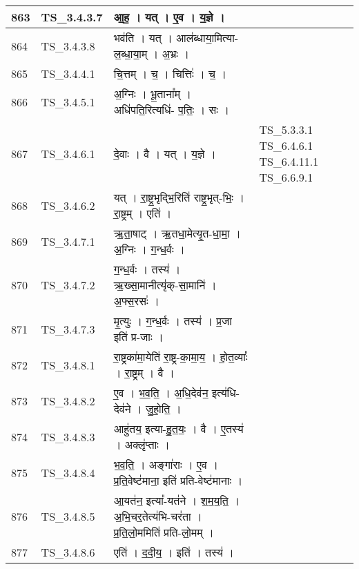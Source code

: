 \documentclass[17pt]{extarticle}
\begin{document}
\begin{longtable}{||p{0.4in}||p{0.9in}||p{4.0in}||p{0.9in}||}
        \hline
            863 & TS\_3.4.3.7 & आ॒ह॒   ।   यत्   ।   ए॒व   ।   य॒ज्ञे   ।    &      \\
        \hline
            864 & TS\_3.4.3.8 & भव॑ति   ।   यत्   ।   आल॑ब्धाया॒मित्या{-}ल॒ब्धा॒या॒म्   ।   अ॒भ्रः   ।    &      \\
        \hline
            865 & TS\_3.4.4.1 & चि॒त्तम्   ।   च॒   ।   चित्तिः॑   ।   च॒   ।    &      \\
        \hline
            866 & TS\_3.4.5.1 & अ॒ग्निः   ।   भू॒ताना᳚म्   ।   अधि॑पति॒रित्यधि॑{-} प॒तिः॒   ।   सः   ।    &      \\
        \hline
            867 & TS\_3.4.6.1 & दे॒वाः   ।   वै   ।   यत्   ।   य॒ज्ञे   ।    &  TS\_5.3.3.1 TS\_6.4.6.1 TS\_6.4.11.1 TS\_6.6.9.1       \\
        \hline
            868 & TS\_3.4.6.2 & यत्   ।   रा॒ष्ट्र॒भृद्भि॒रिति॑ राष्ट्र॒भृत्{-}भिः॒   ।   रा॒ष्ट्रम्   ।   एति॑   ।    &      \\
        \hline
            869 & TS\_3.4.7.1 & ऋ॒ता॒षाट्   ।   ऋ॒तधा॒मेत्यृ॒त{-}धा॒मा॒   ।   अ॒ग्निः   ।   ग॒न्ध॒र्वः   ।    &      \\
        \hline
            870 & TS\_3.4.7.2 & ग॒न्ध॒र्वः   ।   तस्य॑   ।   ऋ॒ख्सा॒मानीत्यृ॑क्{-}सा॒मानि॑   ।   अ॒फ्स॒रसः॑   ।    &      \\
        \hline
            871 & TS\_3.4.7.3 & मृ॒त्युः   ।   ग॒न्ध॒र्वः   ।   तस्य॑   ।   प्र॒जा इति॑ प्र{-}जाः   ।    &      \\
        \hline
            872 & TS\_3.4.8.1 & रा॒ष्ट्रका॑मा॒येति॑ रा॒ष्ट्र{-}का॒मा॒य॒   ।   हो॒त॒व्याः᳚   ।   रा॒ष्ट्रम्   ।   वै   ।    &      \\
        \hline
            873 & TS\_3.4.8.2 & ए॒व   ।   भ॒व॒ति॒   ।   अ॒धि॒देव॑न॒ इत्य॑धि{-}देव॑ने   ।   जु॒हो॒ति॒   ।    &      \\
        \hline
            874 & TS\_3.4.8.3 & आहु॑तय॒ इत्या{-}हु॒त॒यः॒   ।   वै   ।   ए॒तस्य॑   ।   अक्लृ॑प्ताः   ।    &      \\
        \hline
            875 & TS\_3.4.8.4 & भ॒व॒ति॒   ।   अङ्गा॑राः   ।   ए॒व   ।   प्र॒ति॒वेष्ट॑माना॒ इति॑ प्रति{-}वेष्ट॑मानाः   ।    &      \\
        \hline
            876 & TS\_3.4.8.5 & आ॒यत॑न॒ इत्या᳚{-}यत॑ने   ।   श॒म॒य॒ति॒   ।   अ॒भि॒चर॒तेत्य॑भि{-}चर॑ता   ।   प्र॒ति॒लो॒ममिति॑ प्रति{-}लो॒मम्   ।    &      \\
        \hline
            877 & TS\_3.4.8.6 & एति॑   ।   द॒दी॒य॒   ।   इति॑   ।   तस्य॑   ।    &      \\

\end{longtable}
\end{document}
